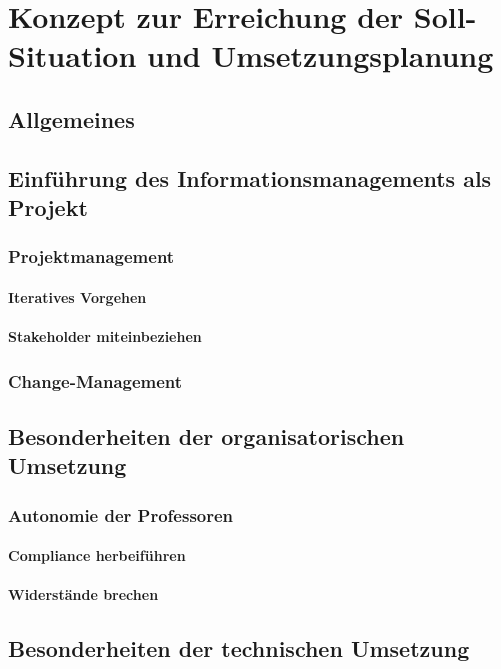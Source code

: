 \chapter{Konzept zur Erreichung der Soll-Situation und Umsetzungsplanung}

\section{Allgemeines}

\section{Einführung des Informationsmanagements als Projekt}
\subsection{Projektmanagement}
\subsubsection{Iteratives Vorgehen}
\subsubsection{Stakeholder miteinbeziehen}

\subsection{Change-Management}
\section{Besonderheiten der organisatorischen Umsetzung}
\subsection{Autonomie der Professoren}
\subsubsection{Compliance herbeiführen}
\subsubsection{Widerstände brechen}

\section{Besonderheiten der technischen Umsetzung}